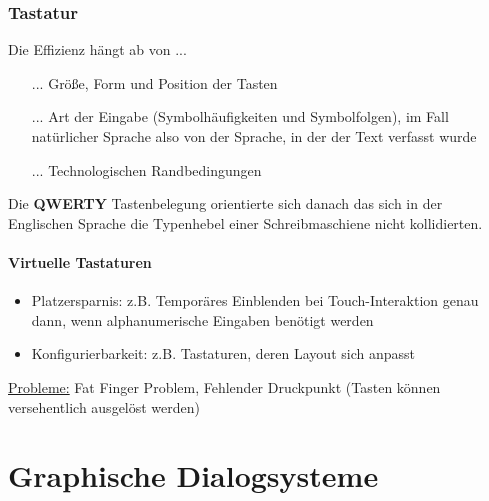 \documentclass
[
	8pt,		%
	ngerman,	%
	a4paper,	%
	landscape,	%
	final		%
]{extarticle}
\begin{document}
\begin{multicols*}{4}
	\subsubsection{Tastatur}
	Die Effizienz hängt ab von ...
	\begin{itemize}
		\item[...] Größe, Form und Position der Tasten
		\item[...] Art der Eingabe (Symbolhäufigkeiten und Symbolfolgen), im
		      Fall natürlicher Sprache also von der Sprache, in der der Text
		      verfasst wurde
		\item[...] Technologischen Randbedingungen
	\end{itemize}
	Die \textbf{QWERTY} Tastenbelegung orientierte sich danach das sich in der
	Englischen Sprache die Typenhebel einer Schreibmaschiene nicht kollidierten.
	\paragraph{Virtuelle Tastaturen}
	\begin{itemize}
		\item Platzersparnis: z.B. Temporäres Einblenden bei Touch-Interaktion
		      genau dann, wenn alphanumerische Eingaben benötigt werden
		\item Konfigurierbarkeit: z.B. Tastaturen, deren Layout sich anpasst
	\end{itemize}
	\underline{Probleme:} Fat Finger Problem, Fehlender Druckpunkt
	(Tasten können versehentlich ausgelöst werden)
	\section{Graphische Dialogsysteme}

\end{multicols*}
\end{document}

